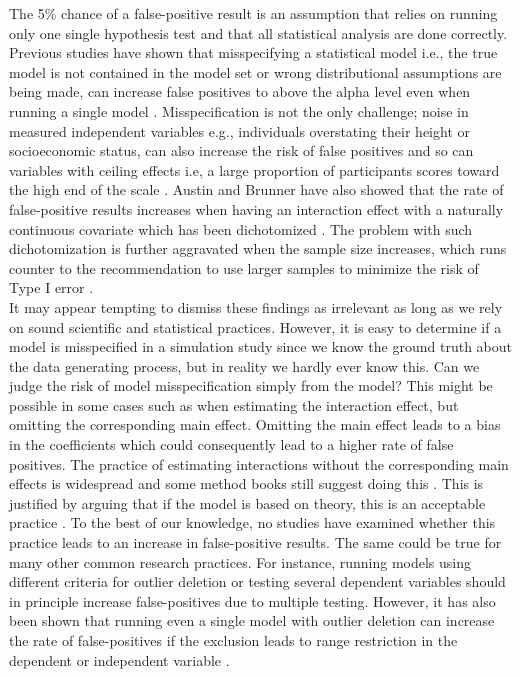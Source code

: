 The 5\% chance of a false-positive result is an assumption that relies on running only one single hypothesis test and that all statistical analysis are done correctly. Previous studies have shown that misspecifying a statistical model i.e., the true model is not contained in the model set or wrong distributional assumptions are being made, can increase false positives to above the alpha level even when running a single model \citep{Dennis2019,Litiere2007}. Misspecification is not the only challenge; noise in measured independent variables e.g., individuals overstating their height or socioeconomic status, can also increase the risk of false positives \citep{Brunner2009} and so can variables with ceiling effects i.e, a large proportion of participants scores toward the high end of the scale \citep{Austin2003}. Austin and Brunner have also showed that the rate of false-positive results increases when having an interaction effect with a naturally continuous covariate which has been dichotomized \citep{Austin2004}. The problem with such dichotomization is further aggravated when the sample size increases, which runs counter to the recommendation to use larger samples to minimize the risk of Type I error \citep{simmons2018}. 
\\
It may appear tempting to dismiss these findings as irrelevant as long as we rely on sound scientific and statistical practices. However, it is easy to determine if a model is misspecified in a simulation study since we know the ground truth about the data generating process, but in reality we hardly ever know this. Can we judge the risk of model misspecification simply from the model? This might be possible in some cases such as when estimating the interaction effect, but omitting the corresponding main effect. Omitting the main effect leads to a bias in the coefficients \citep{Branbor2006} which could consequently lead to a higher rate of false positives. The practice of estimating interactions without the corresponding main effects is widespread \citep{Branbor2006} and some method books still suggest doing this \citep{Cleves2008}. This is justified by arguing that if the model is based on theory, this is an acceptable practice \citep{aiken1991multiple}. To the best of our knowledge, no studies have examined whether this practice leads to an increase in false-positive results. The same could be true for many other common research practices. For instance, running models using different criteria for outlier deletion or testing several dependent variables should in principle increase false-positives due to multiple testing. However, it has also been shown that running even a single model with outlier deletion can increase the rate of false-positives if the exclusion leads to range restriction in the dependent or independent variable \citep{Raju2003}. \\        

